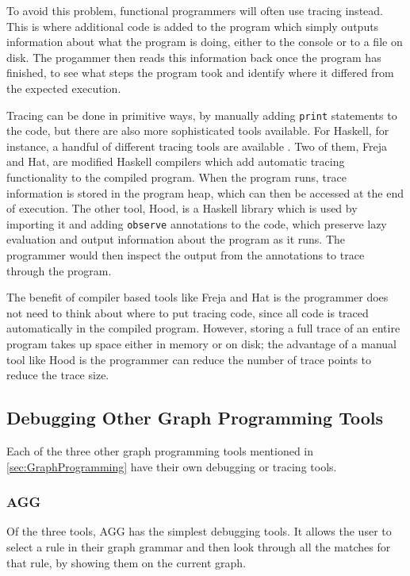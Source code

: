 \documentclass[authoryearcitations]{UoYCSproject}
\begin{document}
To avoid this problem, functional programmers will often use tracing instead.
This is where additional code is added to the program which simply outputs
information about what the program is doing, either to the console or to a file on
disk. The progammer then reads this information back once the program has finished,
to see what steps the program took and identify where it differed from the
expected execution.

Tracing can be done in primitive ways, by manually adding \texttt{print}
statements to the code, but there are also more sophisticated tools available.
For Haskell, for instance, a handful of different tracing tools are
available \citep{runciman2000}. Two of them, Freja and Hat, are modified Haskell
compilers which add automatic tracing functionality to the compiled program. When
the program runs, trace information is stored in the program heap, which can then
be accessed at the end of execution. The other tool, Hood, is a Haskell library
which is used by importing it and adding \texttt{observe} annotations to the code,
which preserve lazy evaluation and output information about the program as it runs.
The programmer would then inspect the output from the annotations to trace through
the program.

The benefit of compiler based tools like Freja and Hat is the programmer does not
need to think about where to put tracing code, since all code is traced automatically
in the compiled program. However, storing a full trace of an entire program takes
up space either in memory or on disk; the advantage of a manual tool like Hood is
the programmer can reduce the number of trace points to reduce the trace size.


\subsection{Debugging Other Graph Programming Tools}
\label{sec:DebuggingOtherGraphProgrammingTools}

Each of the three other graph programming tools mentioned in
\autoref{sec:GraphProgramming} have their own debugging or tracing tools.

\subsubsection{AGG}

Of the three tools, AGG has the simplest debugging tools. It allows the user to
select a rule in their graph grammar and then look through all the matches for
that rule, by showing them on the current graph.
\end{document}
